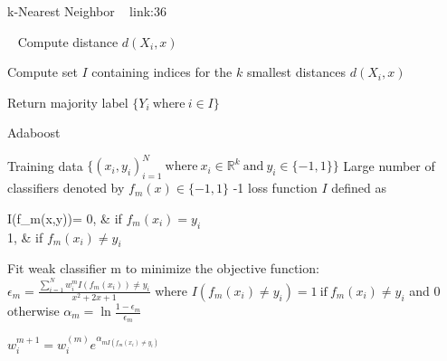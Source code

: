 \documentclass[a4paper]{article}
\begin{document}
  \begin{algorithm}
 
   \caption{k-Nearest Neighbor  ~ \cite{knearest91} link:{36} }
    \begin{algorithmic}[1]
      \
            \State Compute distance $d{(X_i,x)}$
        \EndFor
        
         \State Compute set $I$ containing indices for the $k$ smallest distances $d{(X_i,x)}$
     
       \State Return majority label $\{Y_i \ \text{where}\ i \in I \}$



 \EndFunction
 


\end{algorithmic}
\end{algorithm}






  \begin{algorithm}
   \caption{Adaboost  ~ \cite{adaboostfirst}}
    \begin{algorithmic}[1]
    \INPUT 
    \Statex Training data $\{(x_i,y_i)_{i=1}^N \ \text{where}\ x_i \in  \mathbb{R}^k \ \text{and} \  y_i \in \{-1,1\} \}$
    \Statex Large number of classifiers denoted by $f_m(x) \in \{-1,1\} $
    \Statex 0-1 loss function $I$ defined as 
 \begin{numcases}{ I(f_m(x,y))=}
  0, & if $ f_m(x_i) = y_i $\\
  1, &  if $ f_m(x_i) \neq y_i $
\end{numcases}
     
            \State Fit weak classifier m to minimize the objective function:
            \State $\epsilon_m =  \frac{\sum_{i=1}^N w_{i}^m I(f_m(x_i)) \neq y_i}{x^2+2x+1} $
            \State where  $I(f_m(x_i) \neq y_i) =1 \  \text{if} \ f_m(x_i) \neq y_i  $ and 0 otherwise
            \State $\alpha_m = \ln \frac{1- \epsilon_m}{\epsilon_m}$
            
        \EndFor
              \State $w_{i}^ {m+1} = w_{i} ^{(m)} e^{\alpha_{mI(f_m(x_i) \neq y_i)}} $ 
         \EndFor 
         
        
        \EndFor
        
        


\end{algorithmic}
\end{algorithm}
\end{document}
